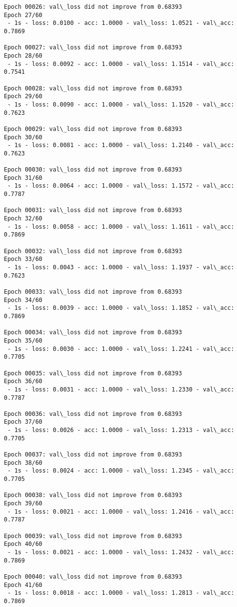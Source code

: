 \documentclass[11pt]{article}
\begin{document}
\begin{Verbatim}[commandchars=\\\{\}]
Epoch 00026: val\_loss did not improve from 0.68393
Epoch 27/60
 - 1s - loss: 0.0100 - acc: 1.0000 - val\_loss: 1.0521 - val\_acc: 0.7869

Epoch 00027: val\_loss did not improve from 0.68393
Epoch 28/60
 - 1s - loss: 0.0092 - acc: 1.0000 - val\_loss: 1.1514 - val\_acc: 0.7541

Epoch 00028: val\_loss did not improve from 0.68393
Epoch 29/60
 - 1s - loss: 0.0090 - acc: 1.0000 - val\_loss: 1.1520 - val\_acc: 0.7623

Epoch 00029: val\_loss did not improve from 0.68393
Epoch 30/60
 - 1s - loss: 0.0081 - acc: 1.0000 - val\_loss: 1.2140 - val\_acc: 0.7623

Epoch 00030: val\_loss did not improve from 0.68393
Epoch 31/60
 - 1s - loss: 0.0064 - acc: 1.0000 - val\_loss: 1.1572 - val\_acc: 0.7787

Epoch 00031: val\_loss did not improve from 0.68393
Epoch 32/60
 - 1s - loss: 0.0058 - acc: 1.0000 - val\_loss: 1.1611 - val\_acc: 0.7869

Epoch 00032: val\_loss did not improve from 0.68393
Epoch 33/60
 - 1s - loss: 0.0043 - acc: 1.0000 - val\_loss: 1.1937 - val\_acc: 0.7623

Epoch 00033: val\_loss did not improve from 0.68393
Epoch 34/60
 - 1s - loss: 0.0039 - acc: 1.0000 - val\_loss: 1.1852 - val\_acc: 0.7869

Epoch 00034: val\_loss did not improve from 0.68393
Epoch 35/60
 - 1s - loss: 0.0030 - acc: 1.0000 - val\_loss: 1.2241 - val\_acc: 0.7705

Epoch 00035: val\_loss did not improve from 0.68393
Epoch 36/60
 - 1s - loss: 0.0031 - acc: 1.0000 - val\_loss: 1.2330 - val\_acc: 0.7787

Epoch 00036: val\_loss did not improve from 0.68393
Epoch 37/60
 - 1s - loss: 0.0026 - acc: 1.0000 - val\_loss: 1.2313 - val\_acc: 0.7705

Epoch 00037: val\_loss did not improve from 0.68393
Epoch 38/60
 - 1s - loss: 0.0024 - acc: 1.0000 - val\_loss: 1.2345 - val\_acc: 0.7705

Epoch 00038: val\_loss did not improve from 0.68393
Epoch 39/60
 - 1s - loss: 0.0021 - acc: 1.0000 - val\_loss: 1.2416 - val\_acc: 0.7787

Epoch 00039: val\_loss did not improve from 0.68393
Epoch 40/60
 - 1s - loss: 0.0021 - acc: 1.0000 - val\_loss: 1.2432 - val\_acc: 0.7869

Epoch 00040: val\_loss did not improve from 0.68393
Epoch 41/60
 - 1s - loss: 0.0018 - acc: 1.0000 - val\_loss: 1.2813 - val\_acc: 0.7869


\end{Verbatim}
\end{document}
